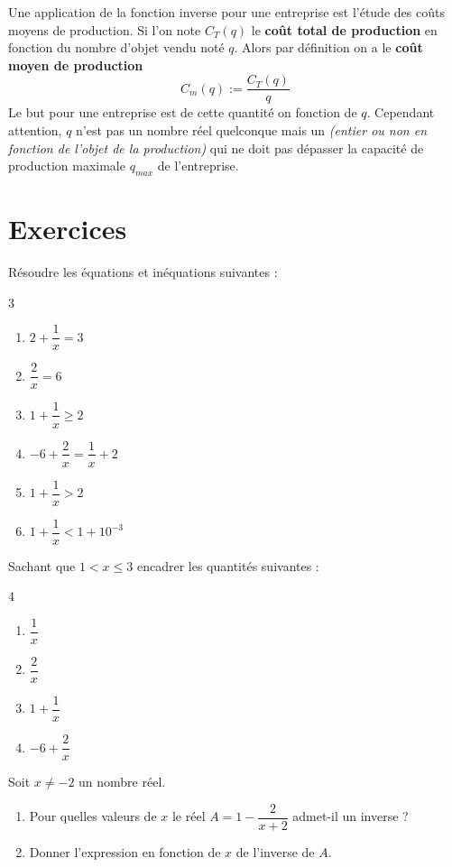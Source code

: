 \documentclass[french]{book}
\begin{document}
\begin{memento}
Une application de la fonction inverse pour une entreprise est l'étude des coûts moyens de production. Si l'on note $C_T(q)$ le \textbf{coût total de production} en fonction du nombre d'objet vendu noté $q$. Alors par définition on a le \textbf{coût moyen de production}
$$C_m(q):= \dfrac{C_T(q)}{q}$$ 
Le but pour une entreprise est de  cette quantité on fonction de $q$. Cependant attention, $q$ n'est pas un nombre réel quelconque mais un  \textit{(entier ou non en fonction de l'objet de la production)} qui ne doit pas dépasser la capacité de production maximale $q_{max}$ de l'entreprise. 
\end{memento}

\newpage
\section{Exercices}

\begin{exocor}
Résoudre les équations et inéquations suivantes :
\begin{multicols}{3}
\begin{enumerate}
\item $2+\dfrac{1}{x}=3$
\item $\dfrac{2}{x}=6$
\item $1+\dfrac{1}{x} \geq 2 $
\item $-6+\dfrac{2}{x}=\dfrac{1}{x}+2$
\item $1+\dfrac{1}{x} > 2 $
\item $1+\dfrac{1}{x} < 1+ 10^{-3}  $
\end{enumerate}
\end{multicols}
\end{exocor}

\begin{exocor}
Sachant que $1<x\leq 3$ encadrer les quantités suivantes :
\begin{multicols}{4}
\begin{enumerate}
\item $\dfrac{1}{x}$
\item $\dfrac{2}{x}$
\item $1+\dfrac{1}{x} $
\item $-6+\dfrac{2}{x}$
\end{enumerate}
\end{multicols}
\end{exocor}

\begin{exocor}
Soit $x \neq -2$ un nombre réel. 
\begin{enumerate}
\item Pour quelles valeurs de $x$ le réel $A=1- \dfrac{2}{x+2}$ admet-il un inverse ?
\item Donner l'expression en fonction de $x$ de l'inverse de $A$.
\end{enumerate}
\end{exocor}
\end{document}
